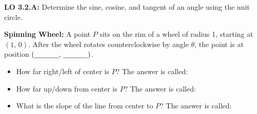 \documentclass[10pt]{article}
\begin{document}
\namedateperiod

\vspace{0.10in}

\begin{objectivebox}
\textbf{LO 3.2.A:} Determine the sine, cosine, and tangent of an angle using the unit circle.\\[4pt]
\end{objectivebox}

\vspace{0.10in}

\begin{vocabbox}
\end{vocabbox}

\vspace{0.10in}

\begin{hookbox}
\textbf{Spinning Wheel:} A point $P$ sits on the rim of a wheel of radius 1, starting at $(1,\, 0)$.
After the wheel rotates counterclockwise by angle $\theta$, the point is at position $(\underline{\hspace{1.2cm}},\, \underline{\hspace{1.2cm}})$.
\begin{itemize}[leftmargin=1.4em, itemsep=2pt]
  \item How far right/left of center is $P$? \hfill The answer is called: \blank{2.4cm}
  \item How far up/down from center is $P$? \hfill The answer is called: \blank{2.4cm}
  \item What is the slope of the line from center to $P$? \hfill The answer is called: \blank{2.4cm}
\end{itemize}
\end{hookbox}

\vspace{0.10in}
\end{document}
